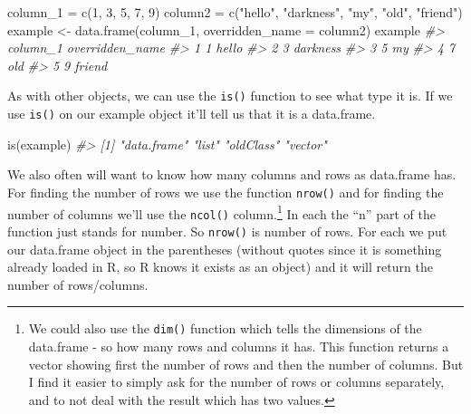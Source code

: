 \documentclass[
]{krantz}
\makeatletter
\newenvironment{Shaded}{\begin{snugshade}}{\end{snugshade}}
\newcommand{\AttributeTok}[1]{\textcolor[rgb]{0.61,0.61,0.61}{#1}}
\newcommand{\CommentTok}[1]{\textcolor[rgb]{0.37,0.37,0.37}{\textit{#1}}}
\newcommand{\DecValTok}[1]{\textcolor[rgb]{0.06,0.06,0.06}{#1}}
\newcommand{\FunctionTok}[1]{\textcolor[rgb]{0,0,0}{#1}}
\newcommand{\NormalTok}[1]{#1}
\newcommand{\OtherTok}[1]{\textcolor[rgb]{0.37,0.37,0.37}{#1}}
\newcommand{\StringTok}[1]{\textcolor[rgb]{0.5,0.5,0.5}{#1}}
\newenvironment{kframe}{%
\medskip{}
\setlength{\fboxsep}{.8em}
 \def\at@end@of@kframe{}%
 \ifinner\ifhmode%
  \def\at@end@of@kframe{\end{minipage}}%
  \begin{minipage}{\columnwidth}%
 \fi\fi%
 \def\FrameCommand##1{\hskip\@totalleftmargin \hskip-\fboxsep
 \colorbox{shadecolor}{##1}\hskip-\fboxsep
     \hskip-\linewidth \hskip-\@totalleftmargin \hskip\columnwidth}%
 \MakeFramed {\advance\hsize-\width
   \@totalleftmargin\z@ \linewidth\hsize
   \@setminipage}}%
 {\par\unskip\endMakeFramed%
 \at@end@of@kframe}
\renewenvironment{Shaded}{\begin{kframe}}{\end{kframe}}
\makeatother
\begin{document}
\begin{Shaded}
\begin{Highlighting}[]
\NormalTok{column\_1 }\OtherTok{=} \FunctionTok{c}\NormalTok{(}\DecValTok{1}\NormalTok{, }\DecValTok{3}\NormalTok{, }\DecValTok{5}\NormalTok{, }\DecValTok{7}\NormalTok{, }\DecValTok{9}\NormalTok{)}
\NormalTok{column2  }\OtherTok{=} \FunctionTok{c}\NormalTok{(}\StringTok{"hello"}\NormalTok{, }\StringTok{"darkness"}\NormalTok{, }\StringTok{"my"}\NormalTok{, }\StringTok{"old"}\NormalTok{, }\StringTok{"friend"}\NormalTok{)}
\NormalTok{example }\OtherTok{\textless{}{-}} \FunctionTok{data.frame}\NormalTok{(column\_1, }
           \AttributeTok{overridden\_name =}\NormalTok{ column2)}
\NormalTok{example}
\CommentTok{\#\textgreater{}   column\_1 overridden\_name}
\CommentTok{\#\textgreater{} 1        1           hello}
\CommentTok{\#\textgreater{} 2        3        darkness}
\CommentTok{\#\textgreater{} 3        5              my}
\CommentTok{\#\textgreater{} 4        7             old}
\CommentTok{\#\textgreater{} 5        9          friend}
\end{Highlighting}
\end{Shaded}

As with other objects, we can use the \texttt{is()} function to see what type it is. If we use \texttt{is()} on our example object it'll tell us that it is a data.frame.

\begin{Shaded}
\begin{Highlighting}[]
\FunctionTok{is}\NormalTok{(example)}
\CommentTok{\#\textgreater{} [1] "data.frame" "list"       "oldClass"   "vector"}
\end{Highlighting}
\end{Shaded}

We also often will want to know how many columns and rows as data.frame has. For finding the number of rows we use the function \texttt{nrow()} and for finding the number of columns we'll use the \texttt{ncol()} column.\footnote{We could also use the \texttt{dim()} function which tells the dimensions of the data.frame - so how many rows and columns it has. This function returns a vector showing first the number of rows and then the number of columns. But I find it easier to simply ask for the number of rows or columns separately, and to not deal with the result which has two values.} In each the ``n'' part of the function just stands for number. So \texttt{nrow()} is number of rows. For each we put our data.frame object in the parentheses (without quotes since it is something already loaded in R, so R knows it exists as an object) and it will return the number of rows/columns.
\end{document}
